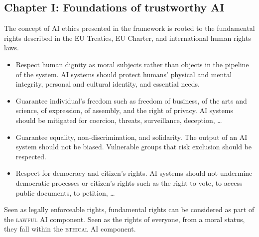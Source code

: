\subsection{Chapter I: Foundations of trustworthy AI} \label{sec:hleg_ch1}

The concept of AI ethics presented in the framework is rooted to the fundamental rights described in the EU Treaties, EU Charter, and international human rights laws.

\begin{remark}
    \phantom{}
    \begin{itemize}
        \item Respect human dignity as moral subjects rather than objects in the pipeline of the system. AI systems should protect humans' physical and mental integrity, personal and cultural identity, and essential needs.
        \item Guarantee individual's freedom such as freedom of business, of the arts and science, of expression, of assembly, and the right of privacy. AI systems should be mitigated for coercion, threats, surveillance, deception, \dots
        \item Guarantee equality, non-discrimination, and solidarity. The output of an AI system should not be biased. Vulnerable groups that risk exclusion should be respected.
        \item Respect for democracy and citizen's rights. AI systems should not undermine democratic processes or citizen's rights such as the right to vote, to access public documents, to petition, \dots
    \end{itemize}
\end{remark}

\begin{remark}
    Seen as legally enforceable rights, fundamental rights can be considered as part of the \textsc{lawful} AI component. Seen as the rights of everyone, from a moral status, they fall within the \textsc{ethical} AI component.
\end{remark}

